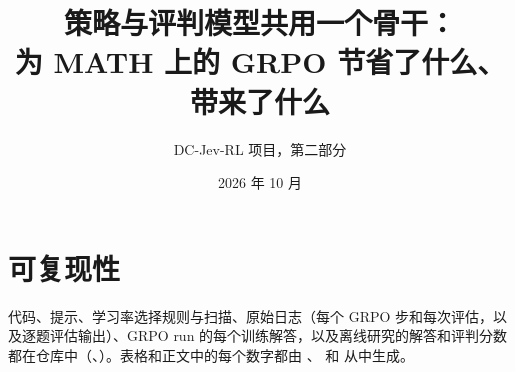 \documentclass[11pt]{ctexart}
\title{策略与评判模型共用一个骨干：\\\kev{} 为 MATH 上的 GRPO 节省了什么、带来了什么}
\author{DC-Jev-RL 项目，第二部分}
\date{2026 年 10 月}
\begin{document}
\maketitle

\begin{abstract}

\end{abstract}








\section*{可复现性}
代码、提示、学习率选择规则与扫描、原始日志（每个 GRPO 步和每次评估，以及逐题评估输出）、GRPO run 的每个训练解答，以及离线研究的解答和评判分数都在仓库中（、）。表格和正文中的每个数字都由 、 和  从中生成。



\end{document}
